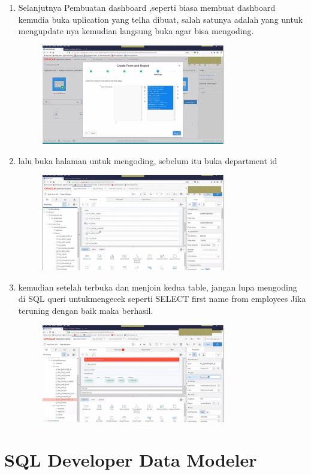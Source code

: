 \documentclass{article}
\begin{document}
\begin{enumerate}
\begin{figure}[h]
            \end{figure}
\item Selanjutnya Pembuatan dashboard ,seperti biasa membuat dashboard kemudia buka uplication yang telha dibuat, salah satunya adalah yang untuk mengupdate nya kemudian langsung buka agar bisa mengoding.
\begin{figure}[h]
\centerline{\includegraphics[width=8cm]{figure/T.png}}
            \end{figure}
\item   lalu buka halaman untuk mengoding, sebelum itu buka department id
\begin{figure}[h]
\centerline{\includegraphics[width=8cm]{figure/U2.png}}
            \end{figure}
\item   kemudian setelah terbuka dan menjoin kedua table, jangan lupa mengoding  di SQL queri untukmengecek seperti SELECT first name from employees
Jika teruning dengan baik maka berhasil.
\begin{figure}[h]
\centerline{\includegraphics[width=8cm]{figure/V.png}}
            \end{figure}
\end{enumerate}
\section{SQL Developer Data Modeler }
\end{document}
